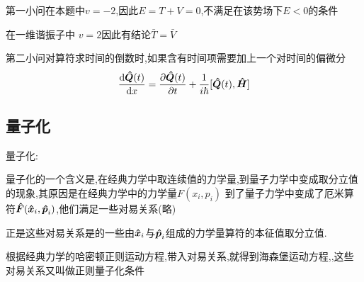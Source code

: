 \documentclass{article}
\begin{document}
            第一小问在本题中$ v = -2 $,因此$ E = T + V = 0 $,不满足在该势场下$E<0$的条件

            在一维谐振子中 $ v = 2 $因此有结论$ \bar{T} = \bar{V} $

            第二小问对算符求时间的倒数时,如果含有时间项需要加上一个对时间的偏微分
            $$ \dv{\vu*{Q}(t)}{x} = \pdv{\vu*{Q}(t)}{t} + \frac{1}{i \hbar } [\vu*{Q}(t),\vu*{H}]$$

        \subsection{量子化}
            \begin{formal}
                量子化:

                量子化的一个含义是,在经典力学中取连续值的力学量,到量子力学中变成取分立值的现象,其原因是在经典力学中的力学量$F(x_{i},p_{i})$
                到了量子力学中变成了厄米算符$\vu*{F}(\vu*{x}_{i},\vu*{p}_{i})$,他们满足一些对易关系(略)

                正是这些对易关系是的一些由$\vu*{x}_{i}$与$\vu*{p}_{i}$组成的力学量算符的本征值取分立值.

                根据经典力学的哈密顿正则运动方程,带入对易关系,就得到海森堡运动方程,,这些对易关系又叫做正则量子化条件

            \end{formal}
    
\end{document}
